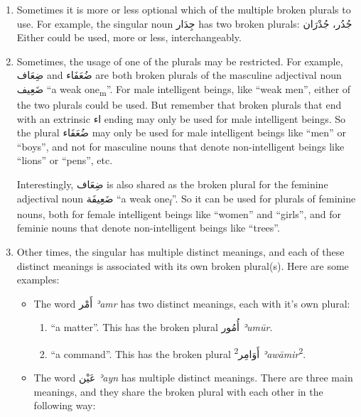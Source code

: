 \documentclass[
  10pt,
]{book}
\providecommand{\tightlist}{%
  \setlength{\itemsep}{0pt}\setlength{\parskip}{0pt}}
\begin{document}
\begin{enumerate}
\def\labelenumi{\arabic{enumi}.}
\item
  Sometimes it is more or less optional which of the multiple broken plurals to use. For example, the singular noun \foreignlanguage{arabic}{جِدَار} has two broken plurals:
  \foreignlanguage{arabic}{جُدُر، جُدْرَان}
  Either could be used, more or less, interchangeably.
\item
  Sometimes, the usage of one of the plurals may be restricted. For example, \foreignlanguage{arabic}{ضِعَاف} and \foreignlanguage{arabic}{ضُعَفَاء} are both broken plurals of the masculine adjectival noun \foreignlanguage{arabic}{ضَعِيف} \enquote{a weak one\textsubscript{m}}. For male intelligent beings, like \enquote{weak men}, either of the two plurals could be used. But remember that broken plurals that end with an extrinsic \foreignlanguage{arabic}{اء} ending may only be used for male intelligent beings. So the plural \foreignlanguage{arabic}{ضُعَفَاء} may only be used for male intelligent beings like \enquote{men} or \enquote{boys}, and not for masculine nouns that denote non-intelligent beings like \enquote{lions} or \enquote{pens}, etc.

  Interestingly, \foreignlanguage{arabic}{ضِعَاف} is also shared as the broken plural for the feminine adjectival noun \foreignlanguage{arabic}{ضَعِيفَة} \enquote{a weak one\textsubscript{f}}. So it can be used for plurals of feminine nouns, both for female intelligent beings like \enquote{women} and \enquote{girls}, and for feminie nouns that denote non-intelligent beings like \enquote{trees}.
\item
  Other times, the singular has multiple distinct meanings, and each of these distinct meanings is associated with its own broken plural(s). Here are some examples:

  \begin{itemize}
  \item
    The word \foreignlanguage{arabic}{أَمْر} \emph{ʾamr} has two distinct meanings, each with it's own plural:

    \begin{enumerate}
    \def\labelenumii{\roman{enumii}.}
    \tightlist
    \item
      \enquote{a matter}. This has the broken plural \foreignlanguage{arabic}{أُمُور} \emph{ʾumūr}.
    \item
      \enquote{a command}. This has the broken plural \textsuperscript{2}\foreignlanguage{arabic}{أَوَامِر} \emph{ʾawāmir}\textsuperscript{2}.
    \end{enumerate}
  \item
    The word \foreignlanguage{arabic}{عَيْن} \emph{ʾayn} has multiple distinct meanings. There are three main meanings, and they share the broken plural with each other in the following way:


\end{itemize}
\end{enumerate}
\end{document}
